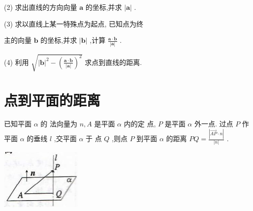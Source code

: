 \documentclass[10pt,cn]{elegantbook}
\begin{document}
(2) 求出直线的方向向量 \(\mathbf{a}\) 的坐标,并求 \(\left| \mathbf{a}\right|\) .

(3) 求以直线上某一特殊点为起点, 已知点为终

主的向量 \(\mathbf{b}\) 的坐标,并求 \(\left| \mathbf{b}\right|\) ,计算 \(\frac{\mathbf{a} \cdot \mathbf{b}}{\left| \mathbf{a}\right| }\) .

(4) 利用 \(\sqrt{{\left| \mathbf{b}\right| }^{2} - {\left( \frac{\mathbf{a} \cdot \mathbf{b}}{\left| \mathbf{a}\right| }\right) }^{2}}\) 求点到直线的距离.

\section{点到平面的距离}

已知平面 \(\alpha\) 的
法向量为 \(n,A\) 是平面 \(\alpha\) 内的定
点, \(P\) 是平面 \(\alpha\) 外一点. 过点 \(P\)
作平面 \(\alpha\) 的垂线 \(l\) ,交平面 \(\alpha\) 于
点 \(Q\) ,则点 \(P\) 到平面 \(\alpha\) 的距离 \({PQ} = \frac{\left| \overrightarrow{AP} \cdot n\right| }{\left| n\right| }\) .

\begin{center}
	\includegraphics[max width=0.3\textwidth]{images/019111e7-c8b0-74a7-8b9e-0df758ddb65d_0_467128.jpg}
\end{center}
\end{document}
